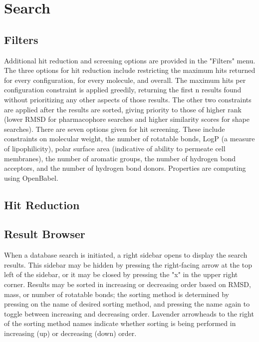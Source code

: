 \section{Search}

\subsection{Filters}
Additional hit reduction and screening options are provided in the "Filters" menu. The three options for hit reduction include restricting the maximum hits returned for every configuration, for every molecule, and overall. The maximum hits per configuration constraint is applied greedily, returning the first n results found without prioritizing any other aspects of those results. The other two constraints are applied after the results are sorted, giving priority to those of higher rank (lower RMSD for pharmacophore searches and higher similarity scores for shape searches). There are seven options given for hit screening. These include constraints on molecular weight, the number of rotatable bonds, LogP (a measure of lipophilicity), polar surface area (indicative of ability to permeate cell membranes), the number of aromatic groups, the number of hydrogen bond acceptors, and the number of hydrogen bond donors. Properties are computing using OpenBabel. 

\subsection{Hit Reduction}

\subsection{Result Browser}
When a database search is initiated, a right sidebar opens to display the search results. This sidebar may be hidden by pressing the right-facing arrow at the top left of the sidebar, or it may be closed by pressing the "x" in the upper right corner. Results may be sorted in increasing or decreasing order based on RMSD, mass, or number of rotatable bonds; the sorting method is determined by pressing on the name of desired sorting method, and pressing the name again to toggle between increasing and decreasing order. Lavender arrowheads to the right of the sorting method names indicate whether sorting is being performed in increasing (up) or decreasing (down) order. 